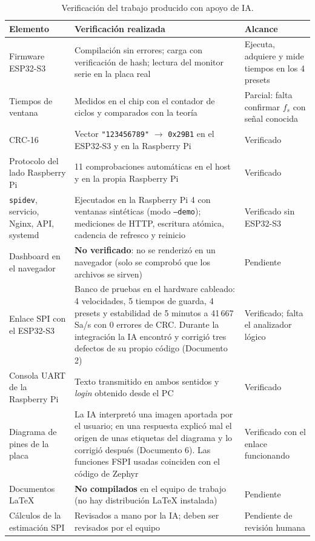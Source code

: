 \documentclass[12pt,a4paper]{article}
\begin{document}
\begin{table}[H]
\centering
\small
\begin{tabular}{@{}p{3.6cm} p{7.4cm} p{4.0cm}@{}}
\toprule
\textbf{Elemento} & \textbf{Verificación realizada} & \textbf{Alcance} \\
\midrule
Firmware ESP32-S3 & Compilación sin errores; carga con verificación de hash; lectura del monitor serie en la placa real & Ejecuta, adquiere y mide tiempos en los 4 presets \\
Tiempos de ventana & Medidos en el chip con el contador de ciclos y comparados con la teoría & Parcial: falta confirmar $f_s$ con señal conocida \\
CRC-16 & Vector \texttt{"123456789"} $\rightarrow$ \texttt{0x29B1} en el ESP32-S3 y en la Raspberry Pi & Verificado \\
Protocolo del lado Raspberry Pi & 11 comprobaciones automáticas en el host y en la propia Raspberry Pi & Verificado \\
\texttt{spidev}, servicio, Nginx, API, systemd & Ejecutados en la Raspberry Pi 4 con ventanas sintéticas (modo \texttt{--demo}); mediciones de HTTP, escritura atómica, cadencia de refresco y reinicio & Verificado sin ESP32-S3 \\
Dashboard en el navegador & \textbf{No verificado}: no se renderizó en un navegador (solo se comprobó que los archivos se sirven) & Pendiente \\
Enlace SPI con el ESP32-S3 & Banco de pruebas en el hardware cableado: 4 velocidades, 5 tiempos de guarda, 4 presets y estabilidad de 5 minutos a 41\,667 Sa/s con 0 errores de CRC. Durante la integración la IA encontró y corrigió tres defectos de su propio código (Documento 2) & Verificado; falta el analizador lógico \\
Consola UART de la Raspberry Pi & Texto transmitido en ambos sentidos y \emph{login} obtenido desde el PC & Verificado \\
Diagrama de pines de la placa & La IA interpretó una imagen aportada por el usuario; en una respuesta explicó mal el origen de unas etiquetas del diagrama y lo corrigió después (Documento 6). Las funciones FSPI usadas coinciden con el código de Zephyr & Verificado con el enlace funcionando \\
Documentos \LaTeX{} & \textbf{No compilados} en el equipo de trabajo (no hay distribución \LaTeX{} instalada) & Pendiente \\
Cálculos de la estimación SPI & Revisados a mano por la IA; deben ser revisados por el equipo & Pendiente de revisión humana \\
\bottomrule
\end{tabular}
\caption{Verificación del trabajo producido con apoyo de IA.}
\end{table}
\end{document}
